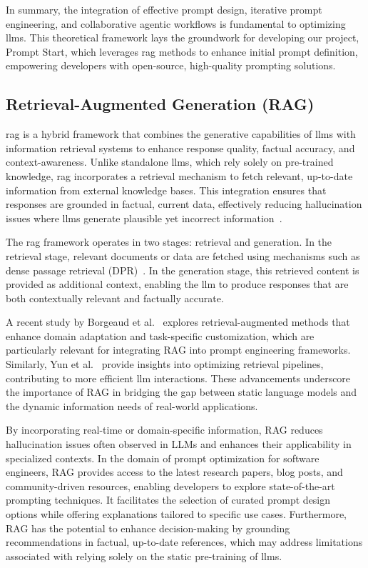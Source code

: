 \documentclass[12pt,twoside,english]{article}
\begin{document}
In summary, the integration of effective prompt design, iterative prompt engineering, and collaborative agentic workflows is fundamental to optimizing \glspl{llm}. This theoretical framework lays the groundwork for developing our project, Prompt Start, which leverages \gls{rag} methods to enhance initial prompt definition, empowering developers with open-source, high-quality prompting solutions.

\subsection{Retrieval-Augmented Generation (RAG)}

\gls{rag} is a hybrid framework that combines the generative capabilities of \glspl{llm} with information retrieval systems to enhance response quality, factual accuracy, and context-awareness. Unlike standalone \glspl{llm}, which rely solely on pre-trained knowledge, \gls{rag} incorporates a retrieval mechanism to fetch relevant, up-to-date information from external knowledge bases. This integration ensures that responses are grounded in factual, current data, effectively reducing hallucination issues where \glspl{llm} generate plausible yet incorrect information~\cite{lewis2020retrieval}.

The \gls{rag} framework operates in two stages: retrieval and generation. In the retrieval stage, relevant documents or data are fetched using mechanisms such as dense passage retrieval (DPR)~\cite{karpukhin2020dense}. In the generation stage, this retrieved content is provided as additional context, enabling the \gls{llm} to produce responses that are both contextually relevant and factually accurate. 

A recent study by Borgeaud et al.~\cite{borgeaud2022improving} explores retrieval-augmented methods that enhance domain adaptation and task-specific customization, which are particularly relevant for integrating RAG into prompt engineering frameworks. Similarly, Yun et al.~\cite{yun2023retrieval} provide insights into optimizing retrieval pipelines, contributing to more efficient \gls{llm} interactions. These advancements underscore the importance of RAG in bridging the gap between static language models and the dynamic information needs of real-world applications.

By incorporating real-time or domain-specific information, RAG reduces hallucination issues often observed in LLMs and enhances their applicability in specialized contexts. In the domain of prompt optimization for software engineers, RAG provides access to the latest research papers, blog posts, and community-driven resources, enabling developers to explore state-of-the-art prompting techniques. It facilitates the selection of curated prompt design options while offering explanations tailored to specific use cases. Furthermore, RAG has the potential to enhance decision-making by grounding recommendations in factual, up-to-date references, which may address limitations associated with relying solely on the static pre-training of \glspl{llm}.
\end{document}
